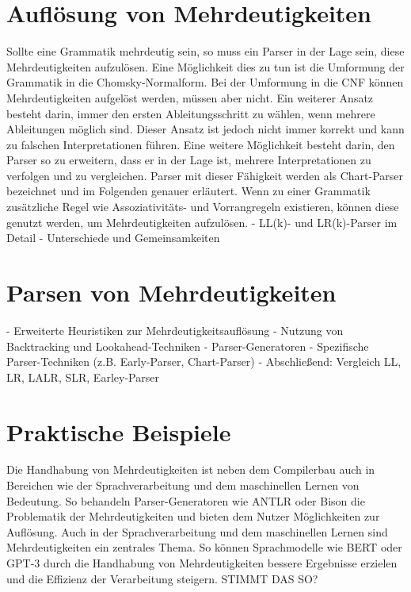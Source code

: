\documentclass[runningheads]{llncs}
\begin{document}
	\section{Auflösung von Mehrdeutigkeiten}

	Sollte eine Grammatik mehrdeutig sein, so muss ein Parser in der Lage sein, diese Mehrdeutigkeiten aufzulösen.
	Eine Möglichkeit dies zu tun ist die Umformung der Grammatik in die Chomsky-Normalform.
	Bei der Umformung in die CNF können Mehrdeutigkeiten aufgelöst werden, müssen aber nicht.
	Ein weiterer Ansatz besteht darin, immer den ersten Ableitungsschritt zu wählen, wenn mehrere Ableitungen möglich sind.
	Dieser Ansatz ist jedoch nicht immer korrekt und kann zu falschen Interpretationen führen.
	Eine weitere Möglichkeit besteht darin, den Parser so zu erweitern,
	dass er in der Lage ist, mehrere Interpretationen zu verfolgen und zu vergleichen.
	Parser mit dieser Fähigkeit werden als Chart-Parser bezeichnet und im Folgenden genauer erläutert.
	Wenn zu einer Grammatik zusätzliche Regel wie Assoziativitäts- und Vorrangregeln existieren,
	können diese genutzt werden, um Mehrdeutigkeiten aufzulösen. \cite{springer2013}
	- LL(k)- und LR(k)-Parser im Detail
	- Unterschiede und Gemeinsamkeiten


	\section{Parsen von Mehrdeutigkeiten}

	- Erweiterte Heuristiken zur Mehrdeutigkeitsauflösung
	- Nutzung von Backtracking und Lookahead-Techniken
	- Parser-Generatoren
	- Spezifische Parser-Techniken (z.B. Early-Parser, Chart-Parser)
	- Abschließend: Vergleich LL, LR, LALR, SLR, Earley-Parser


	\section{Praktische Beispiele}

	Die Handhabung von Mehrdeutigkeiten ist neben dem Compilerbau
	auch in Bereichen wie der Sprachverarbeitung und dem maschinellen Lernen von Bedeutung.
	So behandeln Parser-Generatoren wie ANTLR oder Bison die Problematik der Mehrdeutigkeiten
	und bieten dem Nutzer Möglichkeiten zur Auflösung.
	Auch in der Sprachverarbeitung und dem maschinellen Lernen sind Mehrdeutigkeiten ein zentrales Thema.
	So können Sprachmodelle wie BERT oder GPT-3 durch die Handhabung von Mehrdeutigkeiten
	bessere Ergebnisse erzielen und die Effizienz der Verarbeitung steigern.
	STIMMT DAS SO?
\end{document}
